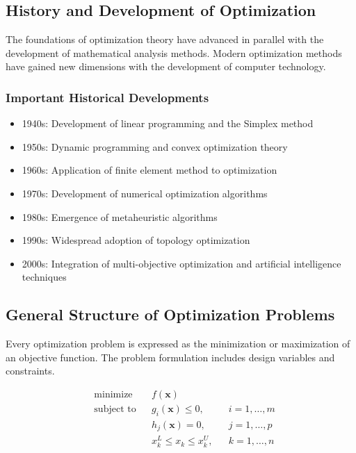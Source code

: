 \subsection{History and Development of Optimization}
The foundations of optimization theory have advanced in parallel with the development of mathematical analysis methods. Modern optimization methods have gained new dimensions with the development of computer technology. 

\subsubsection{Important Historical Developments}
\begin{itemize}
    \item 1940s: Development of linear programming and the Simplex method
    \item 1950s: Dynamic programming and convex optimization theory
    \item 1960s: Application of finite element method to optimization
    \item 1970s: Development of numerical optimization algorithms
    \item 1980s: Emergence of metaheuristic algorithms
    \item 1990s: Widespread adoption of topology optimization
    \item 2000s: Integration of multi-objective optimization and artificial intelligence techniques
\end{itemize}

\subsection{General Structure of Optimization Problems}
Every optimization problem is expressed as the minimization or maximization of an objective function. The problem formulation includes design variables and constraints. 

\begin{equation}
\begin{aligned}
& \text{minimize} & & f(\mathbf{x}) \\
& \text{subject to} & & g_i(\mathbf{x}) \leq 0, & & i = 1,\ldots,m \\
& & & h_j(\mathbf{x}) = 0, & & j = 1,\ldots,p \\
& & & x_k^L \leq x_k \leq x_k^U, & & k = 1,\ldots,n
\end{aligned}
\end{equation}

